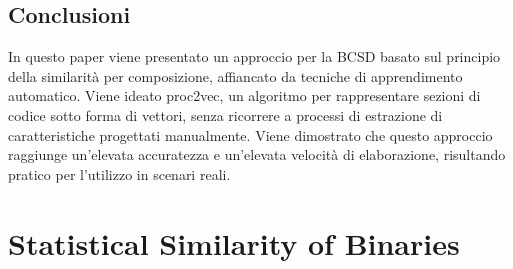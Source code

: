 \documentclass[12pt,a4paper,openright,twoside]{report}
\begin{document}
\subsection{Conclusioni}

In questo paper viene presentato un approccio per la BCSD basato sul principio della similarità per composizione, affiancato da tecniche di apprendimento automatico. Viene ideato proc2vec, un algoritmo per rappresentare sezioni di codice sotto forma di vettori, senza ricorrere a processi di estrazione di caratteristiche progettati manualmente. Viene dimostrato che questo approccio raggiunge un'elevata accuratezza e un'elevata velocità di elaborazione, risultando pratico per l'utilizzo in scenari reali.

\section{Statistical Similarity of Binaries}
\end{document}
